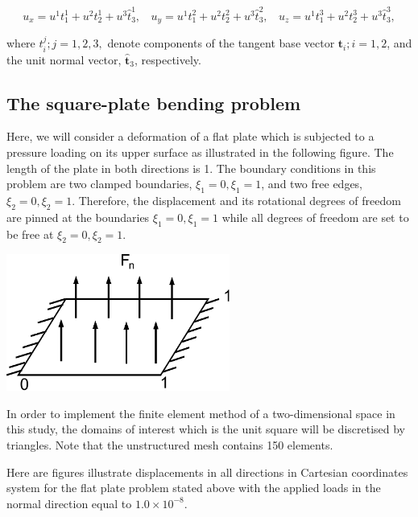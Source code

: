 \[ u_x = u^1t^1_1 + u^2t^1_2 + u^3\hat{t}^1_3, \ \ \ \ u_y = u^1t^2_1 + u^2t^2_2 + u^3\hat{t}^2_3, \ \ \ \ u_z = u^1t^3_1 + u^2t^3_2 + u^3\hat{t}^3_3, \]

where $ t^j_i; j=1,2,3, $ denote components of the tangent base vector $ \mathbf{t}_i; i=1,2 $, and the unit normal vector, $ \mathbf{\hat{t}}_3 $, respectively.



 \hypertarget{index_plate}{}\subsection{The square-\/plate bending problem}\label{index_plate}
Here, we will consider a deformation of a flat plate which is subjected to a pressure loading on its upper surface as illustrated in the following figure. The length of the plate in both directions is 1. The boundary conditions in this problem are two clamped boundaries, $ \xi_1=0, \xi_1=1 $, and two free edges, $ \xi_2=0, \xi_2=1 $. Therefore, the displacement and its rotational degrees of freedom are pinned at the boundaries $ \xi_1=0, \xi_1=1 $ while all degrees of freedom are set to be free at $ \xi_2=0, \xi_2=1 $.

 
\begin{DoxyImage}
\includegraphics[width=0.55\textwidth]{plate_geometry}
\end{DoxyImage}


In order to implement the finite element method of a two-\/dimensional space in this study, the domains of interest which is the unit square will be discretised by triangles. Note that the unstructured mesh contains 150 elements.

Here are figures illustrate displacements in all directions in Cartesian coordinates system for the flat plate problem stated above with the applied loads in the normal direction equal to $ 1.0\times 10^{-8} $.


